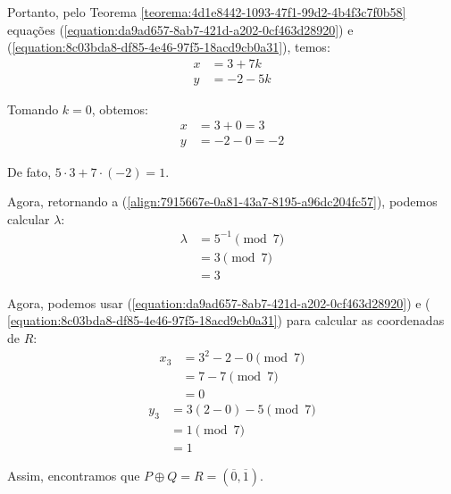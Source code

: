 \begin{exemplo}
	Portanto, pelo Teorema \ref{teorema:4d1e8442-1093-47f1-99d2-4b4f3c7f0b58}
	equações (\ref{equation:da9ad657-8ab7-421d-a202-0cf463d28920}) e
	(\ref{equation:8c03bda8-df85-4e46-97f5-18acd9cb0a31}), temos:
	\begin{align}
		x & = 3 + 7k \nonumber \\
		y & = -2 -5k\nonumber
	\end{align}

	\justify
	Tomando $k = 0$, obtemos:
	\begin{align}
		x & = 3 + 0 = 3 \nonumber  \\
		y & = -2 -0 = -2 \nonumber
	\end{align}

	\justify
	De fato, $5 \cdot 3 + 7 \cdot (-2) = 1$.

	\justify
	Agora, retornando a (\ref{align:7915667e-0a81-43a7-8195-a96dc204fc57}), podemos calcular $\lambda$:
	\begin{align}
		\lambda & = 5^{-1} \pmod{7} \nonumber  \\
		        & = 3 \pmod{7}       \nonumber \\
		        & = 3  \nonumber
	\end{align}

	\justify
	Agora, podemos usar (\ref{equation:da9ad657-8ab7-421d-a202-0cf463d28920}) e ( \ref{equation:8c03bda8-df85-4e46-97f5-18acd9cb0a31}) para calcular as coordenadas de $R$:
	\begin{align}
		x_3 & = 3^2 - 2 - 0 \pmod{7} \nonumber    \\
		    & = 7 - 7 \pmod{7}          \nonumber \\
		    & = 0 \nonumber
	\end{align}
	\begin{align}
		y_3 & = 3(2 - 0) - 5 \pmod{7} \nonumber \\
		    & = 1 \pmod{7} \nonumber            \\
		    & = 1 \nonumber
	\end{align}

	\justify
	Assim, encontramos que $P \oplus Q = R = (\overline{0}, \overline{1})$.
\end{exemplo}

